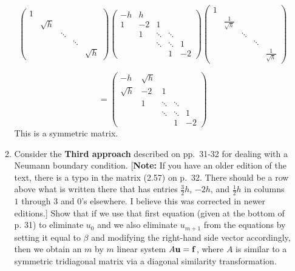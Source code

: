 \documentclass[letterpaper,12pt]{article}
\begin{document}
\begin{enumerate}
\begin{enumerate}
\[
\left( \begin{array}{ccccc}
1 &   &        &        &      \\
  & \sqrt{h} &      &        &      \\
   &   & \ddots & &      \\
   &    &  & \ddots &    \\
   &    &        &       & \sqrt{h} \end{array} \right) \left( \begin{array}{ccccc}
-h & h  &        &        &      \\
1  & -2 & 1      &        &      \\
   & 1  & \ddots & \ddots &      \\
   &    & \ddots & \ddots & 1    \\
   &    &        & 1      & -2 \end{array} \right)
   \left( \begin{array}{ccccc}
1 &   &        &        &      \\
  & \frac{1}{\sqrt{h}} &      &        &      \\
   &   & \ddots & &      \\
   &    &  & \ddots &    \\
   &    &        &       & \frac{1}{\sqrt{h}} \end{array} \right) \]
   
  \[ =  \left( \begin{array}{ccccc}
-h & \sqrt{h} &        &        &      \\
\sqrt{h}  & -2 & 1      &        &      \\
   & 1  & \ddots & \ddots &      \\
   &    & \ddots & \ddots & 1    \\
   &    &        & 1      & -2 \end{array} \right)\]
   This is a symmetric matrix.
\item
Consider the {\bf Third approach} described on pp.~31-32 for dealing with
a Neumann boundary condition.  [{\bf Note:} If you have an older edition of the text,
there is a typo in the matrix (2.57) on p.~32.  There should be a row above what is written
there that has entries $\frac{3}{2} h$, $-2h$, and $\frac{1}{2} h$
in columns $1$ through $3$ and $0$'s elsewhere.  I believe this was corrected in newer editions.]  
Show that if we use that first equation
(given at the bottom of p. 31) to eliminate $u_0$ and we also eliminate
$u_{m+1}$ from the equations by setting it equal to $\beta$ and modifying
the right-hand side vector accordingly, then we obtain an $m$ by $m$
linear system $A {\bf u} = {\bf f}$, where $A$ is similar to a symmetric
tridiagonal matrix via a diagonal similarity transformation.


\end{enumerate}
\end{enumerate}
\end{document}
